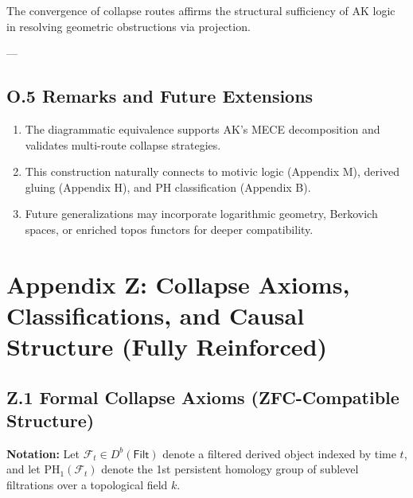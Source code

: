 \documentclass[11pt]{article}
\begin{document}
\begin{axiom}
\begin{axiom}
{{The convergence of collapse routes affirms the structural sufficiency of AK logic in resolving geometric obstructions via projection.

---

\subsection*{O.5 Remarks and Future Extensions}

\begin{enumerate}
  \item The diagrammatic equivalence supports AK’s MECE decomposition and validates multi-route collapse strategies.
  \item This construction naturally connects to motivic logic (Appendix M), derived gluing (Appendix H), and PH classification (Appendix B).
  \item Future generalizations may incorporate logarithmic geometry, Berkovich spaces, or enriched topos functors for deeper compatibility.
\end{enumerate}





\section*{Appendix Z: Collapse Axioms, Classifications, and Causal Structure (Fully Reinforced)}

\subsection*{Z.1 Formal Collapse Axioms (ZFC-Compatible Structure)}

\textbf{Notation:} Let \( \mathcal{F}_t \in D^b(\mathsf{Filt}) \) denote a filtered derived object indexed by time \( t \),  
and let \( \mathrm{PH}_1(\mathcal{F}_t) \) denote the 1st persistent homology group of sublevel filtrations over a topological field \( k \).  

}}
\end{axiom}
\end{axiom}
\end{document}
